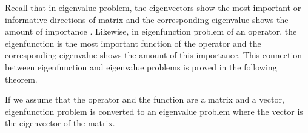 \documentclass[lang=cn,10pt]{gorgeousnbook}
\numberwithin{equation}{section}%
\numberwithin{figure}{section}%
\begin{document}
Recall that in eigenvalue problem, the eigenvectors show the most important or informative directions of matrix and the corresponding eigenvalue shows the amount of importance \cite{ghojogh2019eigenvalue}. Likewise, in eigenfunction problem of an operator, the eigenfunction is the most important function of the operator and the corresponding eigenvalue shows the amount of this importance. 
This connection between eigenfunction and eigenvalue problems is proved in the following theorem. 

\begin{theorem}\label{theorem_connection_eigenfunction_eigenvalue_problems}
If we assume that the operator and the function are a matrix and a vector, eigenfunction problem is converted to an eigenvalue problem where the vector is the eigenvector of the matrix. 
\end{theorem}
\end{document}
